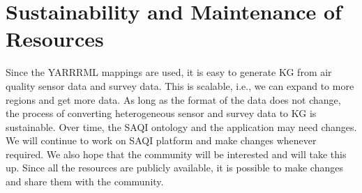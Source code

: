 \section{Sustainability and Maintenance of Resources}
\label{sec:sustainability}

Since the YARRRML mappings are used, it is easy to generate KG from air quality sensor data and survey data. This is scalable, i.e., we can expand to more regions and get more data. As long as the format of the data does not change, the process of converting heterogeneous sensor and survey data to KG is sustainable. Over time, the SAQI ontology and the application may need changes. We will continue to work on SAQI platform and make changes whenever required. We also hope that the community will be interested and will take this up. Since all the resources are publicly available, it is possible to make changes and share them with the community. 

